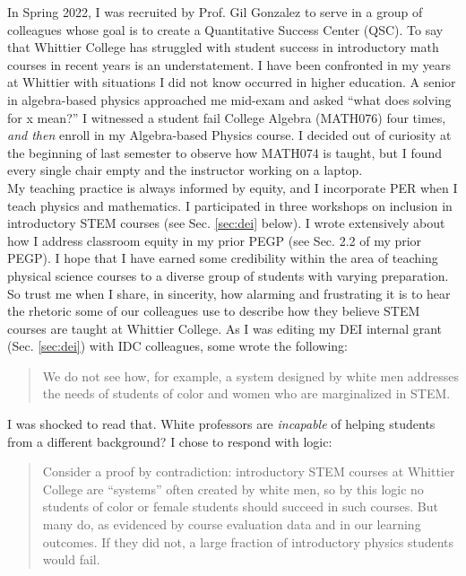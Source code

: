 \documentclass[../../../main.tex]{subfiles}
\begin{document}
\label{sec:qsc}

In Spring 2022, I was recruited by Prof. Gil Gonzalez to serve in a group of colleagues whose goal is to create a Quantitative Success Center (QSC).  To say that Whittier College has struggled with student success in introductory math courses in recent years is an understatement.  I have been confronted in my years at Whittier with situations I did not know occurred in higher education.  A senior in algebra-based physics approached me mid-exam and asked ``what does solving for x mean?'' I witnessed a student fail College Algebra (MATH076) four times, \textit{and then} enroll in my Algebra-based Physics course.  I decided out of curiosity at the beginning of last semester to observe how MATH074 is taught, but I found every single chair empty and the instructor working on a laptop.
\\
\vspace{0.15cm}
My teaching practice is always informed by equity, and I incorporate PER when I teach physics and mathematics.  I participated in three workshops on inclusion in introductory STEM courses (see Sec. \ref{sec:dei} below).  I wrote extensively about how I address classroom equity in my prior PEGP (see Sec. 2.2 of my prior PEGP).  I hope that I have earned some credibility within the area of teaching physical science courses to a diverse group of students with varying preparation.  So trust me when I share, in sincerity, how alarming and frustrating it is to hear the rhetoric some of our colleagues use to describe how they believe STEM courses are taught at Whittier College.  As I was editing my DEI internal grant (Sec. \ref{sec:dei}) with IDC colleagues, some wrote the following:

\begin{quotation}
We do not see how, for example, a system designed by white men addresses the needs of students of color and women who are marginalized in STEM.
\end{quotation}

I was shocked to read that.  White professors are \textit{incapable} of helping students from a different background?  I chose to respond with logic:

\begin{quotation}
Consider a proof by contradiction: introductory STEM courses at Whittier College are ``systems'' often created by white men, so by this logic no students of color or female students should succeed in such courses.  But many do, as evidenced by course evaluation data and in our learning outcomes. If they did not, a large fraction of introductory physics students would fail.
\end{quotation}
\end{document}
